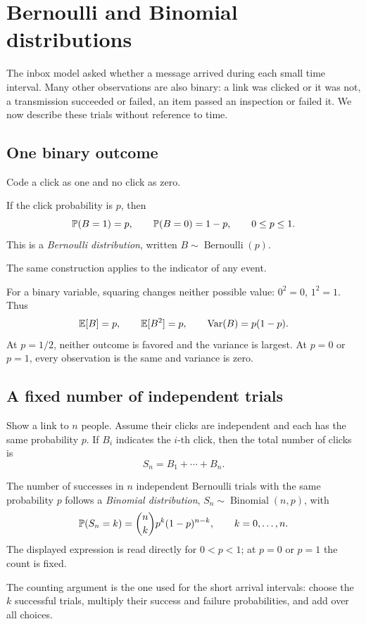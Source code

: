 \section{Bernoulli and Binomial distributions}
\label{sec:bernoulli-binomial}

The inbox model asked whether a message arrived during each small time
interval. Many other observations are also binary: a link was clicked
or it was not, a transmission succeeded or failed, an item passed an
inspection or failed it. We now describe these trials without reference
to time.

\subsection{One binary outcome}

Code a click as one and no click as zero.
\begin{definition}
If the click probability is \(p\), then
\[
  \mathbb{P}(B=1)=p,\qquad \mathbb{P}(B=0)=1-p,\qquad 0\le p\le1.
\]
This is a \emph{Bernoulli distribution}, written
\(B\sim\operatorname{Bernoulli}(p)\).
\end{definition}
The same construction applies to the indicator of any event.

For a binary variable, squaring changes neither possible value:
\(0^2=0\), \(1^2=1\). Thus
\[
  \mathbb{E}[B]=p,\qquad \mathbb{E}[B^2]=p,\qquad \operatorname{Var}(B)=p(1-p).
\]
At \(p=1/2\), neither outcome is favored and the variance is largest.
At \(p=0\) or \(p=1\), every observation is the same and variance is zero.

\subsection{A fixed number of independent trials}

Show a link to \(n\) people. Assume their clicks are independent and each
has the same probability \(p\). If \(B_i\) indicates the \(i\)-th click,
then the total number of clicks is
\[
  S_n=B_1+\cdots+B_n.
\]
\begin{definition}
The number of successes in \(n\) independent Bernoulli trials with
the same probability \(p\) follows a \emph{Binomial distribution},
\(S_n\sim\operatorname{Binomial}(n,p)\), with
\[
  \mathbb{P}(S_n=k)=\binom nk p^k(1-p)^{n-k},\qquad k=0,\ldots,n.
\]
The displayed expression is read directly for \(0<p<1\);
at \(p=0\) or \(p=1\) the count is fixed.
\end{definition}
The counting argument is the one used for the short arrival intervals:
choose the \(k\) successful trials, multiply their success and failure
probabilities, and add over all choices.

